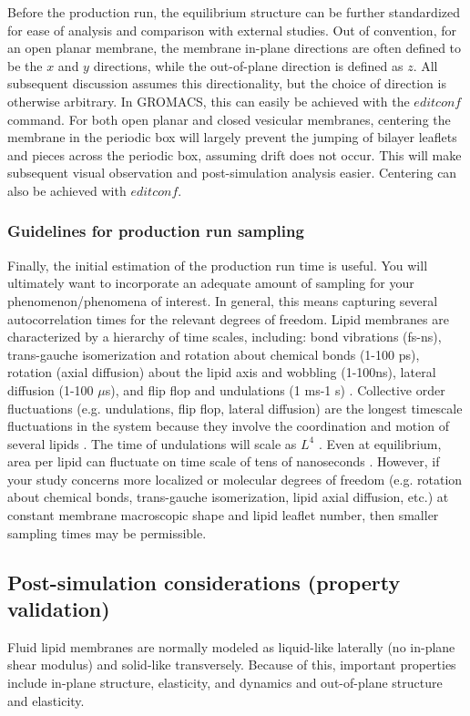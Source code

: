 \documentclass[9pt,bestpractices]{livecoms}
\begin{document}
Before the production run, the equilibrium structure can be further standardized for ease of analysis and comparison with external studies.
Out of convention, for an open planar membrane, the membrane in-plane directions are often defined to be the $x$ and $y$ directions, while the out-of-plane direction is defined as $z$.
All subsequent discussion assumes this directionality, but the choice of direction is otherwise arbitrary.
In GROMACS, this can easily be achieved with the $editconf$ command.
For both open planar and closed vesicular membranes, centering the membrane in the periodic box will largely prevent the jumping of bilayer leaflets and pieces across the periodic box, assuming drift does not occur.
This will make subsequent visual observation and post-simulation analysis easier.
Centering can also be achieved with $editconf$.

\subsubsection{Guidelines for production run sampling}
\label{subsubsec:prodrun}
Finally, the initial estimation of the production run time is useful.
You will ultimately want to incorporate an adequate amount of sampling for your phenomenon/phenomena of interest.
In general, this means capturing several autocorrelation times for the relevant degrees of freedom.
Lipid membranes are characterized by a hierarchy of time scales, including: bond vibrations (fs-ns), trans-gauche isomerization and rotation about chemical bonds (1-100 ps), rotation (axial diffusion) about the lipid axis and wobbling (1-100ns), lateral diffusion (1-100 $\mu$s), and flip flop and undulations (1 ms-1 s) \cite{Vermeer2007,Konig1996,Leftin2011}.
Collective order fluctuations (e.g. undulations, flip flop, lateral diffusion) are the longest timescale fluctuations in the system because they involve the coordination and motion of several lipids \cite{Vermeer2007}.
The time of undulations will scale as $L^4$ \cite{Watson2010a}.
Even at equilibrium, area per lipid can fluctuate on time scale of tens of nanoseconds \cite{Poger2016,Venable2015}.
However, if your study concerns more localized or molecular degrees of freedom (e.g. rotation about chemical bonds, trans-gauche isomerization, lipid axial diffusion, etc.) at constant membrane macroscopic shape and lipid leaflet number, then smaller sampling times may be permissible.

\subsection{Post-simulation considerations (property validation)}
\label{subsec:postsim3}
Fluid lipid membranes are normally modeled as liquid-like laterally (no in-plane shear modulus) and solid-like transversely.
Because of this, important properties include in-plane structure, elasticity, and dynamics and out-of-plane structure and elasticity.
\end{document}
